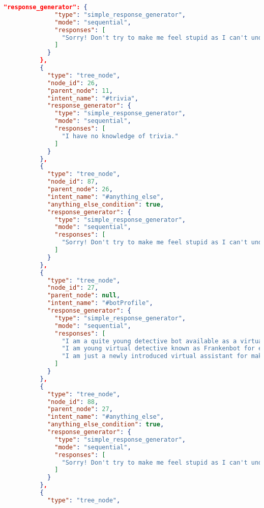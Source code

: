 \begin{appendix}
\begin{lstlisting}[language=json, firstnumber=1]
            "response_generator": {
              "type": "simple_response_generator",
              "mode": "sequential",
              "responses": [
                "Sorry! Don't try to make me feel stupid as I can't understand it. I will be able to reply once my developer will feed me with more training data."
              ]
            }
          },
          {
            "type": "tree_node",
            "node_id": 26,
            "parent_node": 11,
            "intent_name": "#trivia",
            "response_generator": {
              "type": "simple_response_generator",
              "mode": "sequential",
              "responses": [
                "I have no knowledge of trivia."
              ]
            }
          },
          {
            "type": "tree_node",
            "node_id": 87,
            "parent_node": 26,
            "intent_name": "#anything_else",
            "anything_else_condition": true,
            "response_generator": {
              "type": "simple_response_generator",
              "mode": "sequential",
              "responses": [
                "Sorry! Don't try to make me feel stupid as I can't understand it. I will be able to reply once my developer will feed me with more training data."
              ]
            }
          },
          {
            "type": "tree_node",
            "node_id": 27,
            "parent_node": null,
            "intent_name": "#botProfile",
            "response_generator": {
              "type": "simple_response_generator",
              "mode": "sequential",
              "responses": [
                "I am a quite young detective bot available as a virtual entity, named as Frankenbot but much smarter than you.",
                "I am young virtual detective known as Frankenbot for eliminating devils from the society.",
                "I am just a newly introduced virtual assistant for making a society a better place to live in by removing the worst from it."
              ]
            }
          },
          {
            "type": "tree_node",
            "node_id": 88,
            "parent_node": 27,
            "intent_name": "#anything_else",
            "anything_else_condition": true,
            "response_generator": {
              "type": "simple_response_generator",
              "mode": "sequential",
              "responses": [
                "Sorry! Don't try to make me feel stupid as I can't understand it. I will be able to reply once my developer will feed me with more training data."
              ]
            }
          },
          {
            "type": "tree_node",

\end{lstlisting}
\end{appendix}
